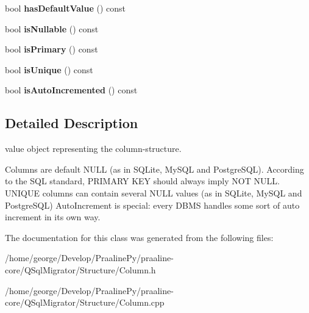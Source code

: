 \begin{DoxyCompactItemize}
bool {\bfseries has\+Default\+Value} () const
\item 
\mbox{\label{class_q_sql_migrator_1_1_structure_1_1_column_a060a6d14a93017019375c241dd935e56}} 
bool {\bfseries is\+Nullable} () const
\item 
\mbox{\label{class_q_sql_migrator_1_1_structure_1_1_column_acaf70ce9bbafe16c5668c61e700b098d}} 
bool {\bfseries is\+Primary} () const
\item 
\mbox{\label{class_q_sql_migrator_1_1_structure_1_1_column_ae6af908fbd37d6e39731f2db2cbcf88d}} 
bool {\bfseries is\+Unique} () const
\item 
\mbox{\label{class_q_sql_migrator_1_1_structure_1_1_column_ae0471c72ac74d17352d3181cea0d5619}} 
bool {\bfseries is\+Auto\+Incremented} () const
\end{DoxyCompactItemize}


\subsection{Detailed Description}
value object representing the column-\/structure. 

Columns are default N\+U\+LL (as in S\+Q\+Lite, My\+S\+QL and Postgre\+S\+QL). According to the S\+QL standard, P\+R\+I\+M\+A\+RY K\+EY should always imply N\+OT N\+U\+LL. U\+N\+I\+Q\+UE columns can contain several N\+U\+LL values (as in S\+Q\+Lite, My\+S\+QL and Postgre\+S\+QL) Auto\+Increment is special\+: every D\+B\+MS handles some sort of auto increment in its own way. 

The documentation for this class was generated from the following files\+:\begin{DoxyCompactItemize}
\item 
/home/george/\+Develop/\+Praaline\+Py/praaline-\/core/\+Q\+Sql\+Migrator/\+Structure/Column.\+h\item 
/home/george/\+Develop/\+Praaline\+Py/praaline-\/core/\+Q\+Sql\+Migrator/\+Structure/Column.\+cpp\end{DoxyCompactItemize}
